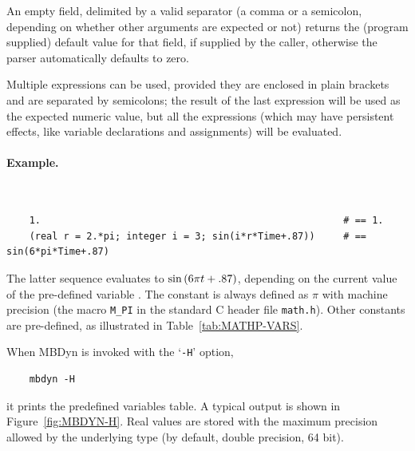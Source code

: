 An empty field, delimited by a valid separator (a comma or a semicolon,
depending on whether other arguments are expected or not) returns the
(program supplied) default value for that field, if supplied by the caller, 
otherwise the parser automatically defaults to zero.

Multiple expressions can be used, provided they are enclosed in plain 
brackets and are separated by semicolons; the result 
of the last expression will be used as the expected numeric value,
but all the expressions (which may have persistent effects, 
like variable declarations and assignments) will be evaluated.

\paragraph{Example.} \
\begin{verbatim}
    1.                                                     # == 1.
    (real r = 2.*pi; integer i = 3; sin(i*r*Time+.87))     # == sin(6*pi*Time+.87)
\end{verbatim}
The latter sequence evaluates to $ \sin\left( 6\pi{t}+.87 \right) $,
depending on the current value of the pre-defined variable .
The constant \kw{pi} is always defined as $ \pi $ with machine precision
(the macro \texttt{M\_PI} in the standard C header file \texttt{math.h}).
Other constants are pre-defined, as illustrated
in Table~\ref{tab:MATHP-VARS}.

When MBDyn is invoked with the `\texttt{-H}' option,
\begin{verbatim}
    mbdyn -H
\end{verbatim}
it prints the predefined variables table.
A typical output is shown in Figure~\ref{fig:MBDYN-H}.
Real values are stored with the maximum precision allowed by the underlying
\kw{real} type (by default, double precision, 64 bit).

